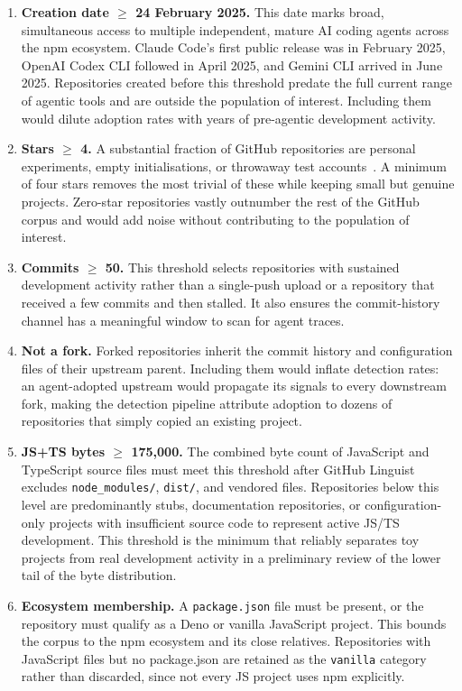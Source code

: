 \begin{enumerate}
  \item \textbf{Creation date $\geq$ 24 February 2025.} This date marks broad, simultaneous access to multiple independent, mature AI coding agents across the npm ecosystem. Claude Code's first public release was in February 2025, OpenAI Codex CLI followed in April 2025, and Gemini CLI arrived in June 2025. Repositories created before this threshold predate the full current range of agentic tools and are outside the population of interest. Including them would dilute adoption rates with years of pre-agentic development activity.

  \item \textbf{Stars $\geq$ 4.} A substantial fraction of GitHub repositories are personal experiments, empty initialisations, or throwaway test accounts~\cite{kalliamvakou2016}. A minimum of four stars removes the most trivial of these while keeping small but genuine projects. Zero-star repositories vastly outnumber the rest of the GitHub corpus and would add noise without contributing to the population of interest.

  \item \textbf{Commits $\geq$ 50.} This threshold selects repositories with sustained development activity rather than a single-push upload or a repository that received a few commits and then stalled. It also ensures the commit-history channel has a meaningful window to scan for agent traces.

  \item \textbf{Not a fork.} Forked repositories inherit the commit history and configuration files of their upstream parent. Including them would inflate detection rates: an agent-adopted upstream would propagate its signals to every downstream fork, making the detection pipeline attribute adoption to dozens of repositories that simply copied an existing project.

  \item \textbf{JS+TS bytes $\geq$ 175,000.} The combined byte count of JavaScript and TypeScript source files must meet this threshold after GitHub Linguist excludes \texttt{node\_modules/}, \texttt{dist/}, and vendored files. Repositories below this level are predominantly stubs, documentation repositories, or configuration-only projects with insufficient source code to represent active JS/TS development. This threshold is the minimum that reliably separates toy projects from real development activity in a preliminary review of the lower tail of the byte distribution.

  \item \textbf{Ecosystem membership.} A \texttt{package.json} file must be present, or the repository must qualify as a Deno or vanilla JavaScript project. This bounds the corpus to the npm ecosystem and its close relatives. Repositories with JavaScript files but no package.json are retained as the \texttt{vanilla} category rather than discarded, since not every JS project uses npm explicitly.
\end{enumerate}

